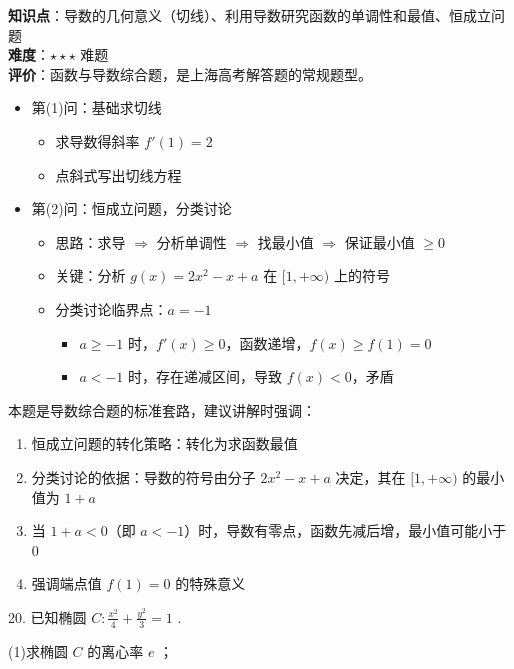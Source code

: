 \documentclass[10pt]{article}
\begin{document}
\begin{analysisbox}[考点分析]
\textbf{知识点}：导数的几何意义（切线）、利用导数研究函数的单调性和最值、恒成立问题\\
\textbf{难度}：\(\star\star\star\) 难题\\
\textbf{评价}：函数与导数综合题，是上海高考解答题的常规题型。
\begin{itemize}
\item 第(1)问：基础求切线
  \begin{itemize}
  \item 求导数得斜率 \(f'(1) = 2\)
  \item 点斜式写出切线方程
  \end{itemize}
\item 第(2)问：恒成立问题，分类讨论
  \begin{itemize}
  \item 思路：求导 $\Rightarrow$ 分析单调性 $\Rightarrow$ 找最小值 $\Rightarrow$ 保证最小值 $\geq 0$
  \item 关键：分析 \(g(x) = 2x^2 - x + a\) 在 \([1, +\infty)\) 上的符号
  \item 分类讨论临界点：\(a = -1\)
    \begin{itemize}
    \item \(a \geq -1\) 时，\(f'(x) \geq 0\)，函数递增，\(f(x) \geq f(1) = 0\)
    \item \(a < -1\) 时，存在递减区间，导致 \(f(x) < 0\)，矛盾
    \end{itemize}
  \end{itemize}
\end{itemize}
\end{analysisbox}

\begin{tipbox}[教学提示]
本题是导数综合题的标准套路，建议讲解时强调：
\begin{enumerate}
\item 恒成立问题的转化策略：转化为求函数最值
\item 分类讨论的依据：导数的符号由分子 \(2x^2 - x + a\) 决定，其在 \([1, +\infty)\) 的最小值为 \(1+a\)
\item 当 \(1+a < 0\)（即 \(a < -1\)）时，导数有零点，函数先减后增，最小值可能小于0
\item 强调端点值 \(f(1) = 0\) 的特殊意义
\end{enumerate}
\end{tipbox}

20. 已知椭圆 \(C : \frac{{x}^{2}}{4} + \frac{{y}^{2}}{3} = 1\) .

(1)求椭圆 \(C\) 的离心率 \(e\) ；
\end{document}
